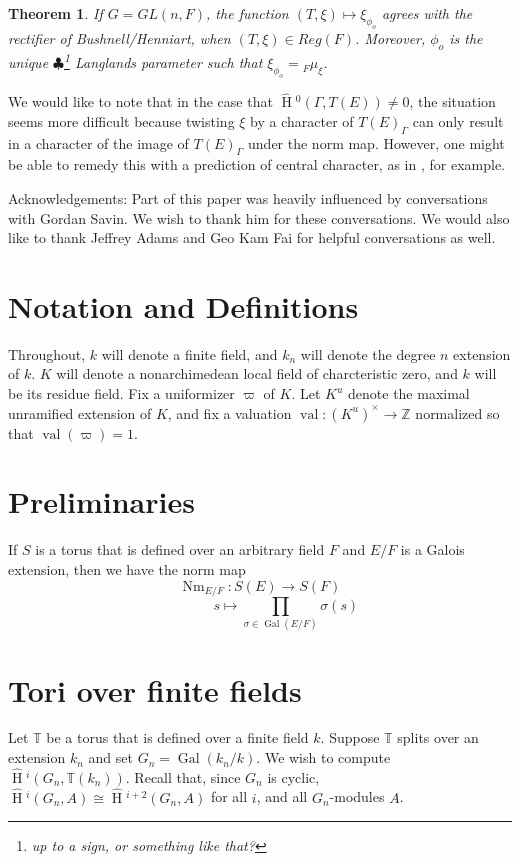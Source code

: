 \documentclass[11pt]{amsart}
\theoremstyle{plain}
\newtheorem{theorem}{Theorem}[section]
\newcommand{\MAxxx}[1]{$\clubsuit$\footnote{#1}}
\newcommand{\HT}[1]{\hat{\HH}{}^{#1}}
\theoremstyle{definition}
\DeclareMathOperator{\Gal}{Gal}
\DeclareMathOperator{\val}{val}
\DeclareMathOperator{\HH}{H}
\DeclareMathOperator{\Nm}{Nm}
\begin{document}
\begin{theorem}
  If $G = GL(n,F)$, the function $(T,\xi) \mapsto \xi_{\phi_o}$ agrees with
  the rectifier of Bushnell/Henniart, when $(T,\xi) \in Reg(F)$.  Moreover, $\phi_o$ is the
  unique \MAxxx{up to a sign, or something like that?} Langlands
  parameter such that $\xi_{\phi_o} = {}_F \mu_{\xi}$.
\end{theorem}

We would like to note that in the case that $\HT{0}(\Gamma, T(E))
\neq 0$, the situation seems more difficult because twisting $\xi$
by a character of $T(E)_{\Gamma}$
can only result in a character of the image
of $T(E)_{\Gamma}$ under the norm map.  However, one might be
able to remedy this with a prediction of central character, as in
\cite{grossreeder}, for example.

Acknowledgements: Part of this paper was heavily influenced by
conversations with Gordan Savin.  We wish to thank him for these
conversations.  We would also like to thank Jeffrey Adams and Geo Kam
Fai for helpful conversations as well.

\section{Notation and Definitions}

Throughout, $k$ will denote a finite field, and
$k_n$ will denote the degree $n$ extension of
$k$.  $K$ will denote a nonarchimedean local field of
charcteristic zero, and $k$ will be its residue field.  Fix
a uniformizer $\varpi$ of $K$.  Let $K^u$ denote the maximal
unramified extension of $K$, and fix a valuation $\val : (K^u)^\times
\rightarrow \mathbb{Z}$ normalized so that $\val(\varpi) = 1$.

\section{Preliminaries}

If $S$ is a torus that is defined over an arbitrary field $F$ and
$E/F$ is a Galois extension, then we have the norm map
$$\Nm_{E/F} : S(E) \rightarrow S(F)$$ $$\ \ \ \ \ \ \ \ \ \ \ \ \ \ \ \ \ s \mapsto
\prod_{\sigma \in \Gal(E/F)} \sigma(s)$$

\section{Tori over finite fields}

Let $\mathbb{T}$ be a torus that is defined over a finite field
$k$.  Suppose $\mathbb{T}$ splits over an extension
$k_n$ and set $G_n = \Gal(k_n/k)$.
We wish to compute $\HT{i}(G_n,\mathbb{T}(k_n))$.
Recall that, since $G_n$ is cyclic, $\HT{i}(G_n,A)\cong
\HT{i+2}(G_n,A)$ for all $i$, and all $G_n$-modules $A$.
\end{document}
